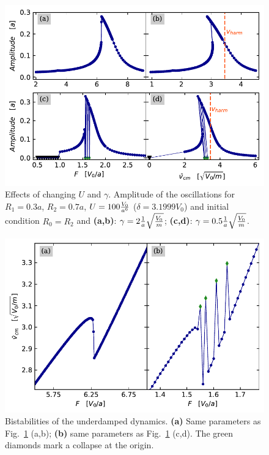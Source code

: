 \begin{figure}
\begin{center}
    \centering
    \includegraphics[width=1\linewidth]{Images/Underdamped_res_2_col.pdf}
    \caption{Effects of changing $U$ and $\gamma$. Amplitude of the oscillations for $R_1 = 0.3 a$, $R_2 = 0.7 a$, $ U = 100 \frac{V_0}{a^6}$ ($\delta = 3.1999  V_0$) and initial condition $R_0=R_2$ and \textbf{(a,b)}: $\gamma = 2 \frac{1}{a}\sqrt{\frac{V_0}{m}}$; \textbf{(c,d)}: $\gamma=0.5 \frac{1}{a}\sqrt{\frac{V_0}{m}}$.}
    \label{Fig:Underdamped_res_2}
\end{center}
\end{figure}

\begin{figure}
\begin{center}
    \centering
    \includegraphics[width=1\linewidth]{Images/Bistability_2.pdf}
    \caption{Bistabilities of the underdamped dynamics. \textbf{(a)} Same parameters as Fig.~\ref{Fig:Underdamped_res_2} (a,b); \textbf{(b)} same parameters as Fig.~\ref{Fig:Underdamped_res_2} (c,d). The green diamonds mark a collapse at the origin.  }
    \label{Fig:Bistability}
\end{center}
\end{figure}


